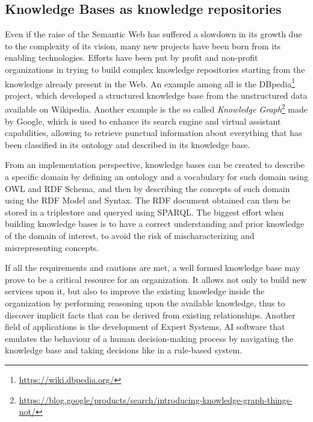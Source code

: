 \documentclass[%
    corpo=13.5pt,
    twoside,
    oldstyle,
    tipotesi=magistrale,
    greek,
    evenboxes
]{toptesi}
\begin{document}
\subsection{Knowledge Bases as knowledge repositories}

Even if the raise of the Semantic Web has suffered a slowdown in its growth
due to the complexity of its vision, many new projects have been born from its
enabling technologies. Efforts have been put by profit and
non-profit organizations in trying to build complex knowledge repositories
starting from the knowledge already present in the Web. An example among all
is the DBpedia\footnote{\url{https://wiki.dbpedia.org/}} project, which
developed a structured knowledge base from the unstructured data available on
Wikipedia.
Another example is the so called
\emph{Knowledge Graph}\footnote{\url{https://blog.google/products/search/introducing-knowledge-graph-things-not/}}
made by Google, which is used to enhance its search engine and virtual assistant
capabilities, allowing to retrieve punctual information about everything that
has been classified in its ontology and described in its knowledge base.

From an implementation perspective, knowledge bases can be created to
describe a specific domain by defining an ontology and a vocabulary for
such domain using OWL and RDF Schema, and then by describing the concepts
of such domain using the RDF Model and Syntax. The RDF document obtained
can then be stored in a triplestore and queryed using SPARQL. The biggest effort
when building knowledge bases is to have a correct understanding and prior
knowledge of the domain of interest, to avoid the risk of mischaracterizing
and misrepresenting concepts.

If all the requirements and cautions are met, a well formed knowledge base may
prove to be a critical resource for an organization. It allows not only to
build new services upon it, but also to improve the existing knowledge inside
the organization by performing reasoning upon the available knowledge, thus
to discover implicit facts that can be derived from existing relationships.
Another field of applications is the development of Expert Systems, AI
software that emulates the behaviour of a human decision-making process by
navigating the knowledge base and taking decisions like in a rule-based system.
\end{document}
